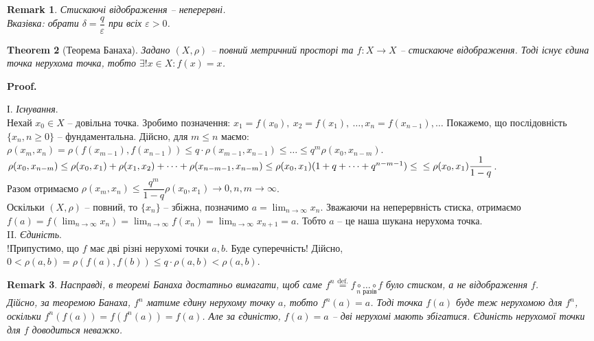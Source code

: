 \documentclass[a4paper, 10pt]{article}
\makeatletter
\theoremstyle{theoremdd}
\newtheorem{theorem}{Theorem}[subsection]
\theoremstyle{theoremdd}
\theoremstyle{theoremdd}
\theoremstyle{theoremdd}
\theoremstyle{theoremdd}
\theoremstyle{theoremdd}
\newtheorem{remark}[theorem]{Remark}
\theoremstyle{theoremdd}
\theoremstyle{theoremdd}
\renewenvironment{proof}[1][Proof.\\]{\par
\pushQED{\hfill \qed}%
\normalfont \topsep6\p@\@plus6\p@\relax
\trivlist
\item\relax
{\bfseries
#1\@addpunct{.}}\hspace\labelsep\ignorespaces
}{%
\popQED\endtrivlist\@endpefalse
}
\makeatother
\begin{document}
\begin{remark}
Стискаючі відображення -- неперервні.\\
\textit{Вказівка: обрати $\delta = \dfrac{q}{\varepsilon}$ при всіх $\varepsilon > 0$.}
\end{remark}

\begin{theorem}[Теорема Банаха]
Задано $(X,\rho)$ -- повний метричний просторі та $f \colon X \to X$ -- стискаюче відображення. Тоді існує єдина точка нерухома точка, тобто $\exists ! x \in X: f(x) = x$.
\end{theorem}

\begin{proof}
І. \textit{Існування}.\\
Нехай $x_0 \in X$ -- довільна точка. Зробимо позначення: $x_1 = f(x_0),\ x_2 = f(x_1),\ \dots, x_n = f(x_{n-1}), \dots$ Покажемо, що послідовність $\{x_n, n \geq 0\}$ -- фундаментальна. Дійсно, для $m \leq n$ маємо:\\
$\rho(x_m, x_n) = \rho(f(x_{m-1}), f(x_{n-1})) \leq q \cdot \rho(x_{m-1},x_{n-1}) \leq \dots \leq q^m \rho(x_0,x_{n-m})$.\\
$\rho(x_0,x_{n-m}) \leq \rho(x_0,x_1) + \rho(x_1,x_2) + \dots + \rho(x_{n-m-1}, x_{n-m}) \leq \rho(x_0,x_1)(1+q+\dots+q^{n-m-1}) \leq \\
\leq \rho (x_0,x_1) \dfrac{1}{1-q}$.\\
Разом отримаємо $\rho(x_m,x_n) \leq \dfrac{q^m}{1-q} \rho(x_0,x_1) \to 0, n,m \to \infty$.\\
Оскільки $(X,\rho)$ -- повний, то $\{x_n\}$ -- збіжна, позначимо $a = \displaystyle\lim_{n \to \infty} x_n$. Зважаючи на неперервність стиска, отримаємо $\displaystyle f(a) = f\left( \lim_{n \to \infty} x_n \right) = \lim_{n \to \infty} f(x_n) = \lim_{n \to \infty} x_{n+1} = a$. Тобто $a$ -- це наша шукана нерухома точка.
\bigskip \\
II. \textit{Єдиність}.\\
!Припустимо, що $f$ має дві різні нерухомі точки $a,b$. Буде суперечність! Дійсно,\\
$0 < \rho(a,b) = \rho(f(a),f(b)) \leq q \cdot \rho(a,b) < \rho(a,b)$.
\end{proof}

\begin{remark}
Насправді, в теоремі Банаха достатньо вимагати, щоб саме $f^n \overset{\text{def.}}{=} \underset{n\text{ разів}}{f \circ \dots \circ f}$ було стиском, а не відображення $f$.\\
Дійсно, за теоремою Банаха, $f^n$ матиме єдину нерухому точку $a$, тобто $f^n(a) = a$. Тоді точка $f(a)$ буде теж нерухомою для $f^n$, оскільки $f^n(f(a)) = f(f^n(a)) = f(a)$. Але за єдиністю, $f(a) = a$ -- дві нерухомі мають збігатися. Єдиність нерухомої точки для $f$ доводиться неважко.
\end{remark}
\end{document}
